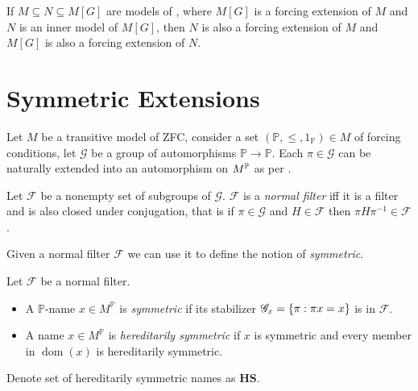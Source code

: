 \begin{theorem}
    \label{proposition:intermediate_model_property}
    If \(M\subseteq N\subseteq M[G]\) are models of \ZFC,
    where \(M[G]\) is a forcing extension of \(M\) and \(N\) is an inner model of \(M[G]\),
    then \(N\) is also a forcing extension of \(M\) and
    \(M[G]\) is also a forcing extension of \(N\).
\end{theorem}


\section{Symmetric Extensions}


\renewcommand*{\G}{\mathscr{G}}
\newcommand*{\dom}{\operatorname{dom}}
Let \(M\) be a transitive model of ZFC, consider a set \((\mathbb{P}, \leq, 1_{\mathbb{P}}) \in M\) of forcing conditions,
let \(\G\) be a group of automorphisms \(\mathbb{P} \to \mathbb{P}\).
Each \(\pi\in \G\) can be naturally extended into an automorphism on \(M^\P\) as per .

\begin{definition}
    Let \(\mathscr{F}\) be a nonempty set of subgroups of \(\G\).
    \(\mathscr{F}\) is a \emph{normal filter} iff it is a filter and is also closed under conjugation, that is
    if \(\pi\in \G\) and \(H\in\mathscr{F}\) then \(\pi H \pi^{-1} \in\mathscr{F}\).
\end{definition}
Given a normal filter \(\mathscr{F}\) we can use it to define the notion of \emph{symmetric}.
\begin{definition}
    Let \(\mathscr{F}\) be a normal filter.
    \begin{itemize}
        \item A \(\mathbb{P}\)-name \(x\in M^{\mathbb{P}}\) is \emph{symmetric} if its stabilizer \(\G_x = \set{\pi: \pi x = x}\) is in \(\mathscr{F}\).
        \item A name \(x\in M^{\mathbb{P}}\) is \emph{hereditarily symmetric} if \(x\) is symmetric and every member in \(\dom(x)\) is hereditarily symmetric.
    \end{itemize}
    Denote set of hereditarily symmetric names as \(\mathbf{HS}\).
\end{definition}

